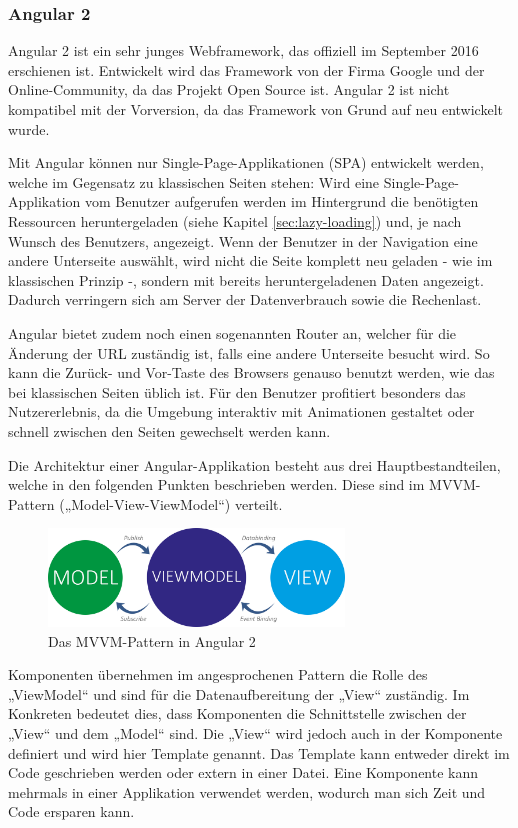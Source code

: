 \clearpage
\subsubsection{Angular 2}
\label{sec:angular}
Angular 2 ist ein sehr junges Webframework, das offiziell im September 2016 erschienen ist. Entwickelt wird das Framework von der Firma Google und der Online-Community, da das Projekt Open Source ist. Angular 2 ist nicht kompatibel mit der Vorversion, da das Framework von Grund auf neu entwickelt wurde.

Mit Angular können nur Single-Page-Applikationen (SPA) entwickelt werden, welche im Gegensatz zu klassischen Seiten stehen: Wird eine Single-Page-Applikation vom Benutzer aufgerufen werden im Hintergrund die benötigten Ressourcen heruntergeladen (siehe Kapitel \ref{sec:lazy-loading}) und, je nach Wunsch des Benutzers, angezeigt. Wenn der Benutzer in der Navigation eine andere Unterseite auswählt, wird nicht die Seite komplett neu geladen - wie im klassischen Prinzip -, sondern mit bereits heruntergeladenen Daten angezeigt. Dadurch verringern sich am Server der Datenverbrauch sowie die Rechenlast.

Angular bietet zudem noch einen sogenannten Router an, welcher für die Änderung der URL zuständig ist, falls eine andere Unterseite besucht wird. So kann die Zurück- und Vor-Taste des Browsers genauso benutzt werden, wie das bei klassischen Seiten üblich ist.
Für den Benutzer profitiert besonders das Nutzererlebnis, da die Umgebung interaktiv mit Animationen gestaltet oder schnell zwischen den Seiten gewechselt werden kann.

Die Architektur einer Angular-Applikation besteht aus drei Hauptbestandteilen, welche in den folgenden Punkten beschrieben werden. Diese sind im MVVM-Pattern („Model-View-ViewModel“) verteilt.

\begin{figure}[ht]
    \centering
	\includegraphics[width=0.7\textwidth]{images/mvvm-pattern}
	\caption{Das MVVM-Pattern in Angular 2}
\end{figure}

\clearpage
{}
Komponenten übernehmen im angesprochenen Pattern die Rolle des „ViewModel“ und sind für die Datenaufbereitung der „View“ zuständig. Im Konkreten bedeutet dies, dass Komponenten die Schnittstelle zwischen der „View“ und dem „Model“ sind. Die „View“ wird jedoch auch in der Komponente definiert und wird hier Template genannt. Das Template kann entweder direkt im Code geschrieben werden oder extern in einer Datei. Eine Komponente kann mehrmals in einer Applikation verwendet werden, wodurch man sich Zeit und Code ersparen kann.

